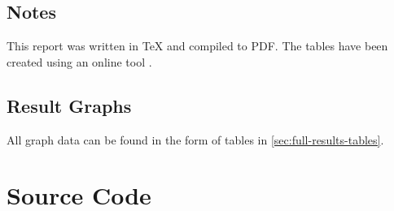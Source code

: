 \documentclass[a4paper]{report}
\begin{document}
\begin{appendices}
	\section{Notes}
	This report was written in TeX and compiled to PDF.
	The tables have been created using an online tool \cite{tables_generator}.

	\section{Result Graphs}
	\label{sec:full-results}
	All graph data can be found in the form of tables in \ref{sec:full-results-tables}.
	
	


	\chapter{Source Code}
	



\end{appendices}
\end{document}
